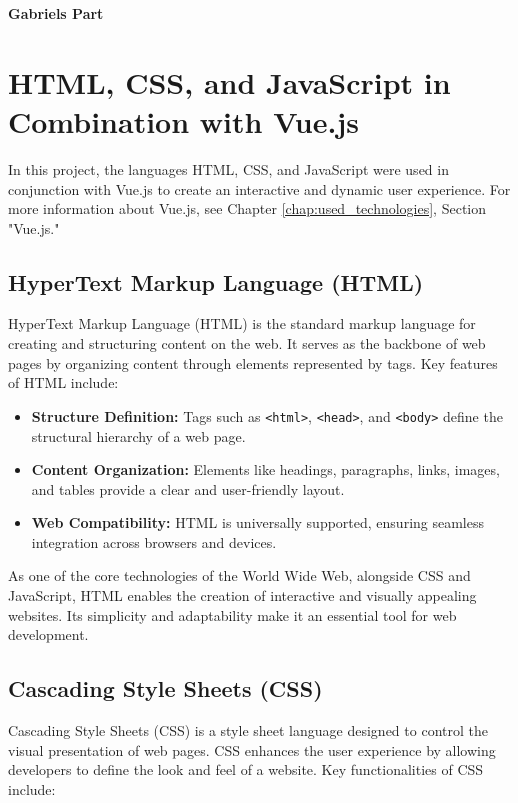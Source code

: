 \textbf{Gabriels Part}

\section{HTML, CSS, and JavaScript in Combination with Vue.js}

In this project, the languages HTML, CSS, and JavaScript were used in conjunction with Vue.js to create an interactive and dynamic user experience. For more information about Vue.js, see Chapter \ref{chap:used_technologies}, Section "Vue.js."

\subsection{HyperText Markup Language (HTML)}

HyperText Markup Language (HTML) is the standard markup language for creating and structuring content on the web. It serves as the backbone of web pages by organizing content through elements represented by tags. Key features of HTML include:

\begin{itemize}
    \item \textbf{Structure Definition:} Tags such as \texttt{<html>}, \texttt{<head>}, and \texttt{<body>} define the structural hierarchy of a web page.
    \item \textbf{Content Organization:} Elements like headings, paragraphs, links, images, and tables provide a clear and user-friendly layout.
    \item \textbf{Web Compatibility:} HTML is universally supported, ensuring seamless integration across browsers and devices.
\end{itemize}

As one of the core technologies of the World Wide Web, alongside CSS and JavaScript, HTML enables the creation of interactive and visually appealing websites. Its simplicity and adaptability make it an essential tool for web development.

\cite{HTML-Wikipedia}

\subsection{Cascading Style Sheets (CSS)}

Cascading Style Sheets (CSS) is a style sheet language designed to control the visual presentation of web pages. CSS enhances the user experience by allowing developers to define the look and feel of a website. Key functionalities of CSS include:

